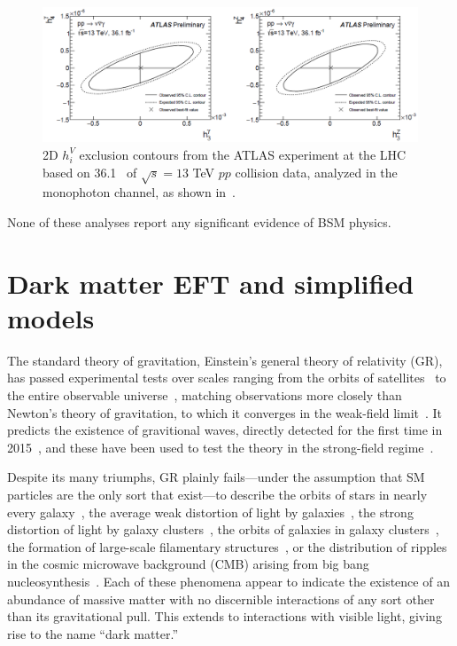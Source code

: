 \documentclass[oneside, letterpaper, 12pt, oldfontcommands]{memoir}
\begin{document}
\begin{figure}[hbtp]
  \begin{center}
    \includegraphics[width=\textwidth]{Figures/atlas_atgc_13tev_2dlimits.png}
    \caption{
      2D $h_{i}^{V}$ exclusion contours from the ATLAS experiment at the LHC based on 36.1 \fbinv\ of $\sqrt{s} = 13$ TeV
      $pp$ collision data, analyzed in the monophoton channel, as shown in~\cite{ref:CERN-EP-2018-220}.
    }
    \label{fig:atlas_atgc_13tev_2dlimits}
  \end{center}
\end{figure}

None of these analyses report any significant evidence of BSM physics.

\section{Dark matter EFT and simplified models} \label{sec:introduction_dm}
The standard theory of gravitation, Einstein's
general theory of relativity (GR), has passed experimental tests over scales ranging from the orbits of satellites~\cite{ref:lrr-2003-1} to the entire observable universe~\cite{ref:planck2018_cosparams},
matching observations more closely than Newton's theory of gravitation, to which it converges in the weak-field limit~\cite{ref:WaldGR}.
It predicts the existence of gravitional waves, directly detected for the first time in 2015~\cite{ref:PhysRevLett.116.061102}, and these have been used to test the theory in the strong-field regime~\cite{ref:PhysRevLett.116.221101}.

Despite its many triumphs, GR plainly fails---under the assumption that SM particles are the only sort that exist---to describe the orbits of stars in nearly every galaxy~\cite{ref:nature25767},
the average weak distortion of light by galaxies~\cite{ref:weaklensing}, the strong distortion of light by galaxy clusters~\cite{ref:mnras/stw3385}, the orbits of galaxies in galaxy clusters~\cite{ref:annurev-astro-081710-102514},
the formation of large-scale filamentary structures~\cite{ref:nature03597},
or the distribution of ripples in the cosmic microwave background (CMB) arising from big bang nucleosynthesis~\cite{ref:planck2018_cosparams}. Each of these phenomena appear to indicate the existence of
an abundance of massive matter with no discernible interactions of any sort other than its gravitational pull. This extends to interactions with visible light,
giving rise to the name ``dark matter.''
\end{document}
